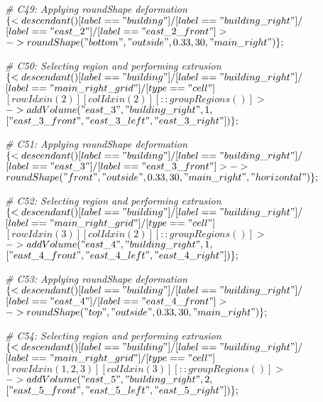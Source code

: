 \noindent \textit{\# C49: Applying roundShape deformation}\\
$\{< descendant() [label=="building"] / [label=="building\_right"] / $\\
$[label=="east\_2"] / [label=="east\_2\_front"] > $\\
$-> roundShape("bottom", "outside", 0.33, 30, "main\_right")\};$

\noindent \textit{\# C50: Selecting region and performing extrusion}\\
$\{< descendant() [label=="building"] / [label=="building\_right"] / $\\
$[label=="main\_right\_grid"] / [type=="cell"] $\\
$[rowIdx in (2)] [colIdx in (2)] [::groupRegions()] > $\\
$-> addVolume("east\_3", "building\_right", 1, $\\
$["east\_3\_front", "east\_3\_left", "east\_3\_right"])\};$

\noindent \textit{\# C51: Applying roundShape deformation}\\
$\{< descendant() [label=="building"] / [label=="building\_right"] / $\\
$[label=="east\_3"] / [label=="east\_3\_front"] > -> $\\
$roundShape("front", "outside", 0.33, 30, "main\_right", "horizontal")\};$

\noindent \textit{\# C52: Selecting region and performing extrusion}\\
$\{< descendant() [label=="building"] / [label=="building\_right"] / $\\
$[label=="main\_right\_grid"] / [type=="cell"] $\\
$[rowIdx in (3)] [colIdx in (2)] [::groupRegions()] > $\\
$-> addVolume("east\_4", "building\_right", 1, $\\
$["east\_4\_front", "east\_4\_left", "east\_4\_right"])\};$

\noindent \textit{\# C53: Applying roundShape deformation}\\
$\{< descendant() [label=="building"] / [label=="building\_right"] / $\\
$[label=="east\_4"] / [label=="east\_4\_front"] > $\\
$-> roundShape("top", "outside", 0.33, 30, "main\_right")\};$

\noindent \textit{\# C54: Selecting region and performing extrusion}\\
$\{< descendant() [label=="building"] / [label=="building\_right"] / $\\
$[label=="main\_right\_grid"] / [type=="cell"] $\\
$[rowIdx in (1, 2, 3)] [colIdx in (3)] [::groupRegions()] > $\\
$-> addVolume("east\_5", "building\_right", 2, $\\
$["east\_5\_front", "east\_5\_left", "east\_5\_right"])\};$


